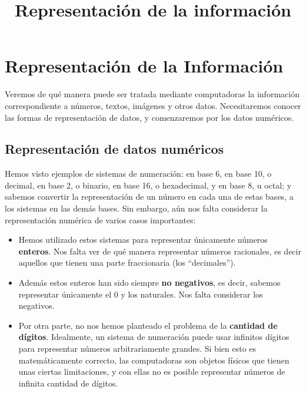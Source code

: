 \documentclass[spanish,A4,]{article}
\title{Representación de la información}
\begin{document}
\maketitle

\section{Representación de la
Información}\label{representaciuxf3n-de-la-informaciuxf3n}

Veremos de qué manera puede ser tratada mediante computadoras la
información correspondiente a números, textos, imágenes y otros datos.
Necesitaremos conocer las formas de representación de datos, y
comenzaremos por los datos numéricos.

\subsection{Representación de datos
numéricos}\label{representaciuxf3n-de-datos-numuxe9ricos}

Hemos visto ejemplos de sistemas de numeración: en base 6, en base 10, o
decimal, en base 2, o binario, en base 16, o hexadecimal, y en base 8, u
octal; y sabemos convertir la representación de un número en cada una de
estas bases, a los sistemas en las demás bases. Sin embargo, aún nos
falta considerar la representación numérica de varios casos importantes:

\begin{itemize}
\itemsep1pt\parskip0pt
\item
  Hemos utilizado estos sistemas para representar únicamente números
  \textbf{enteros}. Nos falta ver de qué manera representar números
  racionales, es decir aquellos que tienen una parte fraccionaria (los
  ``decimales'').
\item
  Además estos enteros han sido siempre \textbf{no negativos}, es decir,
  sabemos representar únicamente el 0 y los naturales. Nos falta
  considerar los negativos.
\item
  Por otra parte, no nos hemos planteado el problema de la
  \textbf{cantidad de dígitos}. Idealmente, un sistema de numeración
  puede usar infinitos dígitos para representar números arbitrariamente
  grandes. Si bien esto es matemáticamente correcto, las computadoras
  son objetos físicos que tienen unas ciertas limitaciones, y con ellas
  no es posible representar números de infinita cantidad de dígitos.
\end{itemize}
\end{document}
